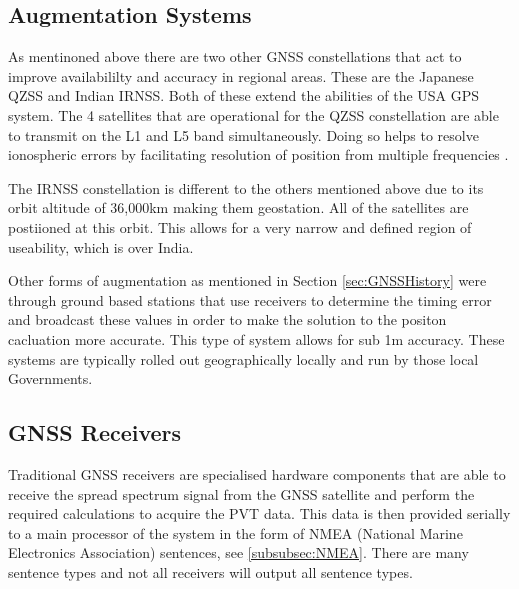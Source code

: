 \subsection{Augmentation Systems} \label{subsec:GNSS_OtherIntro}
As mentinoned above there are two other GNSS constellations that act to improve availabililty and accuracy in regional areas. These are the Japanese QZSS and Indian
IRNSS. Both of these extend the abilities of the USA GPS system. The 4 satellites that are operational for the QZSS constellation are able to transmit on the L1 and L5
band  simultaneously. Doing so helps to resolve ionospheric errors by facilitating resolution of position from multiple frequencies \cite{RN48}.

The IRNSS constellation is different to the others mentioned above due to its orbit altitude of 36,000km making them geostation. All of the satellites are postiioned at
this orbit. This allows for a very narrow and defined region of useability, which is over India. 

Other forms of augmentation as mentioned in Section \ref{sec:GNSSHistory} were through ground based stations that use receivers to determine the timing error and broadcast these
values in order to make the solution to the positon cacluation more accurate. This type of system allows for sub 1m accuracy. These systems are typically rolled out
geographically locally and run by those local Governments.

\subsection{GNSS Receivers}
Traditional GNSS receivers are specialised hardware components that are able to receive the spread spectrum signal from the GNSS satellite and perform the required
calculations to acquire the PVT data. This data is then provided serially to a main processor of the system in the form of NMEA (National Marine Electronics Association)
sentences, see \ref{subsubsec:NMEA}. There are many sentence types
and not all receivers will output all sentence types.


